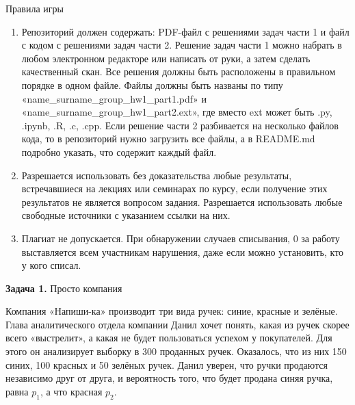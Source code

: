 \documentclass[10pt, a4paper]{extarticle}
\begin{document}
\begin{rulesbox}{Правила игры}
\begin{enumerate}
			\item Репозиторий должен содержать: PDF-файл с решениями задач части 1 и файл с кодом с решениями задач части 2. Решение задач части 1 можно набрать в любом электронном редакторе или написать от руки, а затем сделать качественный скан. Все решения должны быть расположены в правильном порядке в одном файле. Файлы должны быть названы по типу «name\_surname\_group\_hw1\_part1.pdf» и «name\_surname\_group\_hw1\_part2.ext», где вместо ext может быть .py, .ipynb, .R, .c, .cpp. Если решение части 2 разбивается на несколько файлов кода, то в репозиторий нужно загрузить все файлы, а в README.md подробно указать, что содержит каждый файл. 
			\item Разрешается использовать без доказательства любые результаты, встречавшиеся на лекциях или семинарах по курсу, если получение этих результатов не является вопросом задания. Разрешается использовать любые свободные источники с указанием ссылки на них.
			\item Плагиат не допускается.
			 При обнаружении случаев списывания, $0$ за работу выставляется всем участникам нарушения, даже если можно установить, кто у кого списал. 
		\end{enumerate}
	\end{rulesbox}
	
	\newpage
	
	\renewcommand{\labelenumi}{\textbf{[\asbuk{enumi}]}}
	
	{\Large \textbf{Задача 1.} Просто компания}
	
	Компания «Напиши-ка» производит три вида ручек: синие, красные и зелёные. Глава аналитического отдела компании Данил хочет понять, какая из ручек скорее всего «выстрелит», а какая не будет пользоваться успехом у покупателей. Для этого он анализирует выборку в 300 проданных ручек. Оказалось, что из них 150 синих, 100 красных и 50 зелёных ручек. Данил уверен, что ручки продаются независимо друг от друга, и вероятность того, что будет продана синяя ручка, равна $p_1$, а что красная $p_2$.
	
\end{document}
